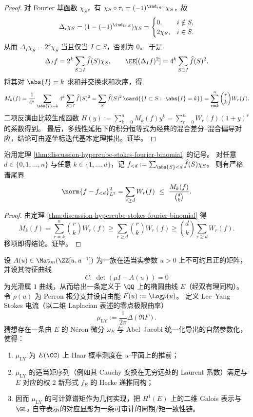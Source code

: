 \begin{proof}
对 Fourier 基函数 \(\chi_S\)，有 \(\chi_S\circ\tau_i=(-1)^{\ind_{i\in S}}\chi_S\)，故
\[
  \Delta_i\chi_S=(1-(-1)^{\ind_{i\in S}})\chi_S=
  \begin{cases}
    0,&i\notin S,\\
    2\chi_S,&i\in S.
  \end{cases}
\]
从而 \(\Delta_I\chi_S=2^k\chi_S\) 当且仅当 \(I\subset S\)，否则为 \(0\)。
于是
\[
  \Delta_I f=2^k\sum_{S\supset I}\widehat f(S)\chi_S,
  \qquad
  \EE[(\Delta_I f)^2]=4^k\sum_{S\supset I}\widehat f(S)^2.
\]
将其对 \(\abs{I}=k\) 求和并交换求和次序，得
\[
  M_k(f)
  =\frac1{4^k}\sum_{\abs{I}=k}4^k\sum_{S\supset I}\widehat f(S)^2
  =\sum_S\widehat f(S)^2\,\card{\{I\subset S:\ \abs{I}=k\}}
  =\sum_{r=k}^n\binom{r}{k}W_r(f).
\]
二项反演由比较生成函数
\(
H(y):=\sum_{k=0}^nM_k(f)y^k=\sum_{r=0}^nW_r(f)(1+y)^r
\)
的系数得到。
最后，多线性延拓下的积分恒等式为经典的混合差分--混合偏导对应，结论可由逐坐标迭代基本定理推出。证毕。
\end{proof}

\begin{theorem}[由差分通量矩给出的谱尾界与证书化误差控制]\label{thm:discussion-spectral-tail-bound-from-flux}
沿用定理 \ref{thm:discussion-hypercube-stokes-fourier-binomial} 的记号。
对任意 \(d\in\{0,1,\dots,n\}\) 与任意 \(k\in\{1,\dots,d\}\)，记 \(f_{<d}:=\sum_{\abs{S}<d}\widehat f(S)\chi_S\)。
则有严格谱尾界
\[
  \norm{f-f_{<d}}_{L^2}^2=\sum_{r\ge d}W_r(f)\ \le\ \frac{M_k(f)}{\binom{d}{k}}.
\]
\end{theorem}

\begin{proof}
由定理 \ref{thm:discussion-hypercube-stokes-fourier-binomial} 得
\[
  M_k(f)=\sum_{r=k}^n\binom{r}{k}W_r(f)
  \ge \sum_{r\ge d}\binom{r}{k}W_r(f)
  \ge \binom{d}{k}\sum_{r\ge d}W_r(f).
\]
移项即得结论。证毕。
\end{proof}

\begin{conjecture}\label{conj:discussion-leyang-stokes-modularity-langlands}
设 \(A(u)\in\Mat_m(\ZZ[u,u^{-1}])\) 为一族在适当实参数 \(u>0\) 上不可约且正的矩阵，并设其特征曲线
\[
  C:\ \det(\mu I-A(u))=0
\]
为光滑属 \(1\) 曲线，从而给出一条定义于 \(\QQ\) 上的椭圆曲线 \(E\)（经双有理同构）。
令 \(\rho(u)\) 为 Perron 根分支并设自由能 \(F(u):=\Log\rho(u)\)。
定义 Lee--Yang--Stokes 电流（以二维 Laplacian 表述的零点极限曲率）
\[
  \mu_{\mathrm{LY}}:=\frac1{2\pi}\Delta(\Re F).
\]
猜想存在一条由 \(E\) 的 N\'eron 微分 \(\omega_E\) 与 Abel--Jacobi 统一化导出的自然参数化，使得：
\begin{enumerate}
  \item \(\mu_{\mathrm{LY}}\) 为 \(E(\CC)\) 上 Haar 概率测度在 \(u\)-平面上的推前；
  \item \(\mu_{\mathrm{LY}}\) 的适当矩序列（例如其 Cauchy 变换在无穷远处的 Laurent 系数）满足与 \(E\) 对应的权 \(2\) 新形式 \(f_E\) 的 Hecke 递推同构；
  \item 因而 \(\mu_{\mathrm{LY}}\) 的可计算谱矩作为几何实现，把 \(H^1(E)\) 上的二维 Galois 表示与 \(\GL_2\) 自守表示的对应显影为一条可审计的周期/矩一致性链。
\end{enumerate}
\end{conjecture}

